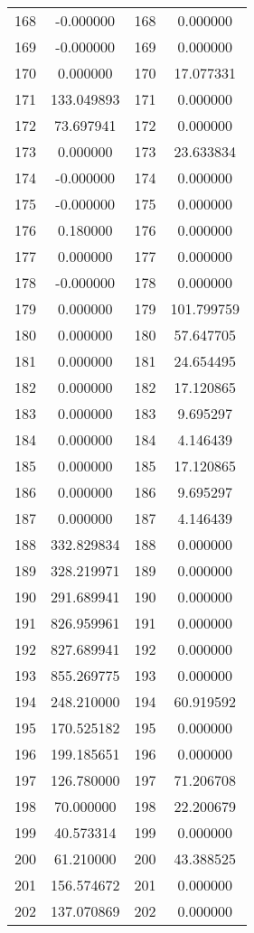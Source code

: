 \documentclass[12pt]{article}
\begin{document}
\begin{longtable}{@{}cccc@{}}
168 & -0.000000 & 168 & 0.000000 \\
169 & -0.000000 & 169 & 0.000000 \\
170 & 0.000000 & 170 & 17.077331 \\
171 & 133.049893 & 171 & 0.000000 \\
172 & 73.697941 & 172 & 0.000000 \\
173 & 0.000000 & 173 & 23.633834 \\
174 & -0.000000 & 174 & 0.000000 \\
175 & -0.000000 & 175 & 0.000000 \\
176 & 0.180000 & 176 & 0.000000 \\
177 & 0.000000 & 177 & 0.000000 \\
178 & -0.000000 & 178 & 0.000000 \\
179 & 0.000000 & 179 & 101.799759 \\
180 & 0.000000 & 180 & 57.647705 \\
181 & 0.000000 & 181 & 24.654495 \\
182 & 0.000000 & 182 & 17.120865 \\
183 & 0.000000 & 183 & 9.695297 \\
184 & 0.000000 & 184 & 4.146439 \\
185 & 0.000000 & 185 & 17.120865 \\
186 & 0.000000 & 186 & 9.695297 \\
187 & 0.000000 & 187 & 4.146439 \\
188 & 332.829834 & 188 & 0.000000 \\
189 & 328.219971 & 189 & 0.000000 \\
190 & 291.689941 & 190 & 0.000000 \\
191 & 826.959961 & 191 & 0.000000 \\
192 & 827.689941 & 192 & 0.000000 \\
193 & 855.269775 & 193 & 0.000000 \\
194 & 248.210000 & 194 & 60.919592 \\
195 & 170.525182 & 195 & 0.000000 \\
196 & 199.185651 & 196 & 0.000000 \\
197 & 126.780000 & 197 & 71.206708 \\
198 & 70.000000 & 198 & 22.200679 \\
199 & 40.573314 & 199 & 0.000000 \\
200 & 61.210000 & 200 & 43.388525 \\
201 & 156.574672 & 201 & 0.000000 \\
202 & 137.070869 & 202 & 0.000000 \\

\end{longtable}
\end{document}
